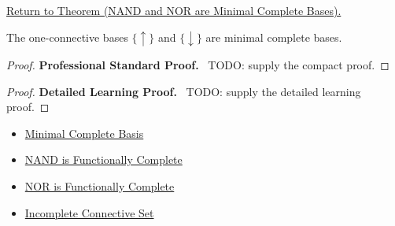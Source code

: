 \newpage
{}
\label{prf:nand-nor-minimal-complete-bases-propositional-logic}

\begin{remark*}[Return]
\hyperref[thm:nand-nor-minimal-complete-bases-propositional-logic]{Return to Theorem (NAND and NOR are Minimal Complete Bases).}
\end{remark*}

\begin{theorem*}
The one-connective bases \(\{\uparrow\}\) and \(\{\downarrow\}\) are minimal
complete bases.
\end{theorem*}

\begin{proof}
\textbf{Professional Standard Proof.}~
TODO: supply the compact proof.
\end{proof}

\begin{proof}
\textbf{Detailed Learning Proof.}~
TODO: supply the detailed learning proof.
\end{proof}

\begin{remark*}
\end{remark*}

\begin{dependencies}
\begin{itemize}
  \item \hyperref[def:minimal-complete-basis-propositional-logic]{Minimal Complete Basis}
  \item \hyperref[thm:nand-functionally-complete-propositional-logic]{NAND is Functionally Complete}
  \item \hyperref[thm:nor-functionally-complete-propositional-logic]{NOR is Functionally Complete}
  \item \hyperref[def:incomplete-connective-set-propositional-logic]{Incomplete Connective Set}
\end{itemize}
\end{dependencies}

\clearpage
